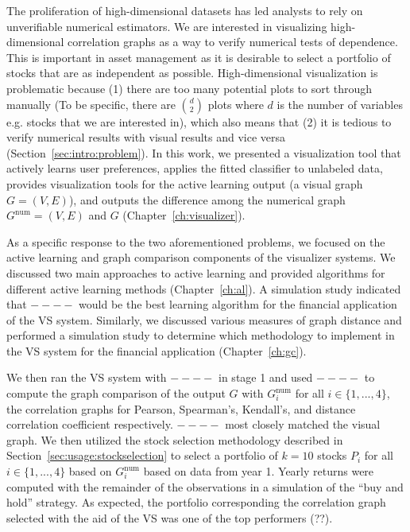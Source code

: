 
The proliferation of high-dimensional datasets has led analysts to rely on 
unverifiable numerical estimators. We are interested in visualizing 
high-dimensional correlation 
graphs as a way to verify numerical tests of dependence. This is important in 
asset management as it is desirable to select a portfolio of stocks that are as 
independent as possible. High-dimensional visualization is problematic because 
(1) there are too many potential plots to sort through manually (To be 
specific, there are $d\choose 2$  plots where $d$ is the number of variables 
e.g. stocks that we are interested in), which also means that (2) it is tedious 
to verify numerical results with visual results and vice versa 
(Section~\ref{sec:intro:problem}). In this work, we 
presented a visualization tool that actively learns user preferences, applies 
the fitted classifier to unlabeled data, provides visualization tools for the 
active learning output (a visual graph $G=(V,E)$), and outputs the difference 
among the numerical graph $G^{\text{num}}=(V,E)$ and $G$ 
(Chapter~\ref{ch:visualizer}).

As a specific response to the two aforementioned problems, we focused on the 
active learning and graph comparison components of the visualizer systems. We 
discussed two main approaches to active learning and provided algorithms for 
different active learning methods (Chapter~\ref{ch:al}). A simulation study 
indicated that $----$ would be the best learning algorithm for the 
financial application of the VS system. Similarly, we discussed various 
measures of graph distance and performed a simulation study to determine which 
methodology to implement in the VS system for the financial application 
(Chapter~\ref{ch:gc}). 

We then ran the VS system with $----$ in stage 1 and 
used $----$ to compute the graph comparison of the output $G$ with 
$G_i^{\text{num}}$ for all $i \in \{1,...,4\}$, the correlation graphs for 
Pearson, Spearman's, Kendall's, and distance correlation coefficient 
respectively. $----$ most closely matched the visual graph. We then utilized 
the stock selection methodology described in 
Section~\ref{sec:usage:stockselection} to select a portfolio of $k = 10$ stocks 
$P_i$ for all $i \in \{1,...,4\}$ based on $G_i^{\text{num}}$ based on data 
from year 1. Yearly returns were computed with the remainder of the 
observations in a simulation of the ``buy and hold'' strategy. As expected, the 
portfolio corresponding the correlation graph selected with the aid of the VS 
was one of the top performers (??).

